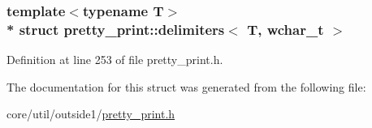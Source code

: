 \subsubsection*{template$<$typename T$>$\\*
struct pretty\+\_\+print\+::delimiters$<$ T, wchar\+\_\+t $>$}



Definition at line 253 of file pretty\+\_\+print.\+h.



The documentation for this struct was generated from the following file\+:\begin{DoxyCompactItemize}
\item 
core/util/outside1/\hyperlink{pretty__print_8h}{pretty\+\_\+print.\+h}\end{DoxyCompactItemize}
